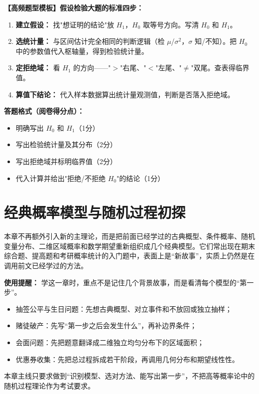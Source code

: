 ﻿\documentclass[lang=cn,11pt]{elegantbook}
\begin{document}
\begin{note}
\textbf{【高频题型模板】假设检验大题的标准四步：}
\begin{enumerate}
    \item \textbf{建立假设：} 找"想证明的结论"放 $H_1$，$H_0$ 取等号方向。写清 $H_0$ 和 $H_1$。
    \item \textbf{选统计量：} 与区间估计完全相同的判断逻辑（检 $\mu$/$\sigma^2$，$\sigma$ 知/不知）。把 $H_0$ 中的参数值代入枢轴量，得到检验统计量。
    \item \textbf{定拒绝域：} 看 $H_1$ 的方向——"$>$"右尾、"$<$"左尾、"$\neq$"双尾。查表得临界值。
    \item \textbf{算值下结论：} 代入样本数据算出统计量观测值，判断是否落入拒绝域。
\end{enumerate}
\textbf{答题格式（阅卷得分点）：}
\begin{itemize}
    \item 明确写出 $H_0$ 和 $H_1$（1分）
    \item 写出检验统计量及其分布（2分）
    \item 写出拒绝域并标明临界值（2分）
    \item 代入计算并给出"拒绝/不拒绝 $H_0$"的结论（1分）
\end{itemize}
\end{note}



\chapter{经典概率模型与随机过程初探}

本章不再额外引入新的主理论，而是把前面已经学过的古典概型、条件概率、随机变量分布、二维区域概率和数学期望重新组织成几个经典模型。它们常出现在期末综合题、提高题和考研概率统计的入门题中，表面上是“新故事”，实质上仍然是在调用前文已经学过的方法。

\begin{note}
\textbf{使用提醒：} 学这一章时，重点不是记住几个背景故事，而是看清每个模型的“第一步”。
\begin{itemize}
    \item 抽签公平与生日问题：先想古典概型、对立事件和不放回或独立抽样；
    \item 赌徒破产：先写“第一步之后会发生什么”，再补边界条件；
    \item 会面问题：先把题意翻译成二维独立均匀分布下的区域面积；
    \item 优惠券收集：先把总过程拆成若干阶段，再调用几何分布和期望线性性。
\end{itemize}
本章主线只要求做到“识别模型、选对方法、能写出第一步”，不把高等概率论中的随机过程理论作为考试要求。
\end{note}
\end{document}
